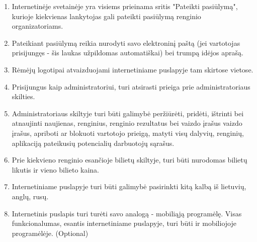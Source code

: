 \documentclass{VUMIFPSkursinis}
\begin{document}
\begin{enumerate}
			\item Internetinėje svetainėje yra visiems prieinama sritis "Pateikti pasiūlymą", kurioje kiekvienas lankytojas gali pateikti pasiūlymą renginio organizatoriams.
			\item Pateikiant pasiūlymą reikia nurodyti savo elektroninį paštą (jei vartotojas prisijungęs - šis laukas užpildomas automatiškai) bei trumpą idėjos aprašą.
			\item Rėmėjų logotipai atvaizduojami internetiniame puslapyje tam skirtose vietose.
			\item Prisijungus kaip administratoriui, turi atsirasti prieiga prie administratoriaus skilties.
			\item Administratoriaus skiltyje turi būti galimybė peržiūrėti, pridėti, ištrinti bei atnaujinti naujienas, renginius, renginio rezultatus bei vaizdo įrašus vaizdo įrašus, apriboti ar blokuoti vartotojo prieigą, matyti visų dalyvių, renginių, aplikaciją pateikusių potencialių darbuotojų sąrašus.
			\item Prie kiekvieno renginio esančioje bilietų skiltyje, turi būti nurodomas bilietų likutis ir vieno bilieto kaina.
			\item Internetiniame puslapyje turi būti galimybė pasirinkti kitą kalbą iš lietuvių, anglų, rusų.
			\item Internetinis puslapis turi turėti savo analogą - mobiliąją programėlę. Visas funkcionalumas, esantis internetiniame puslapyje, turi būti ir mobiliojoje programėlėje. (Optional)
		\end{enumerate}
\end{document}
